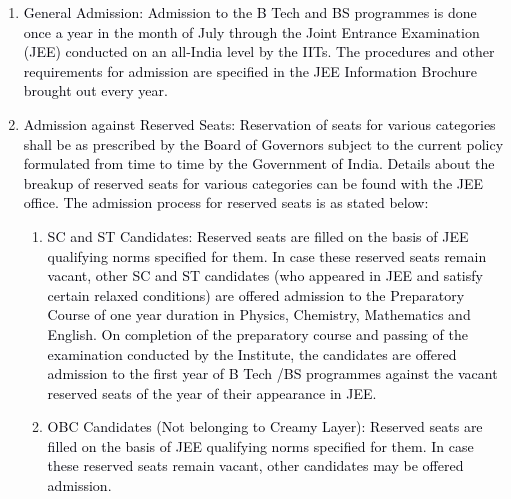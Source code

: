\documentclass[12pt]{article}
\begin{document}
\vspace{\baselineskip}
\begin{enumerate}
	\item {\fontsize{10pt}{12.0pt}\selectfont \textcolor[HTML]{00000A}{General Admission: Admission to the B Tech and BS programmes is done once a year in the month of July through the Joint Entrance Examination (JEE) conducted on an all-India level by the IITs. The procedures and other requirements for admission are specified in the JEE Information Brochure brought out every year.}\par}\par


\vspace{\baselineskip}
	\item {\fontsize{10pt}{12.0pt}\selectfont \textcolor[HTML]{00000A}{Admission against Reserved Seats: Reservation of seats for various categories shall be as prescribed by the Board of Governors subject to the current policy formulated from time to time by the Government of India. Details about the breakup of reserved seats for various categories can be found with the JEE office. The admission process for reserved seats is as stated below:}\par}\par


\vspace{\baselineskip}
\begin{enumerate}
	\item {\fontsize{10pt}{12.0pt}\selectfont \textcolor[HTML]{00000A}{SC and ST Candidates: Reserved seats are filled on the basis of JEE qualifying norms specified for them. In case these reserved seats remain vacant, other SC and ST candidates (who appeared in JEE and satisfy certain relaxed conditions) are offered admission to the Preparatory Course of one year duration in Physics, Chemistry, Mathematics and English. On completion of the preparatory course and passing of the examination conducted by the Institute, the candidates are offered admission to the first year of B Tech /BS programmes against the vacant reserved seats of the year of their appearance in JEE.}\par}\par


\vspace{\baselineskip}
	\item {\fontsize{9pt}{10.8pt}\selectfont \textcolor[HTML]{00000A}{OBC Candidates (Not belonging to Creamy Layer): Reserved seats are filled on the basis of JEE qualifying norms specified for them. In case these reserved seats remain vacant, other candidates may be offered admission.}\par}\par



\end{enumerate}
\end{enumerate}
\end{document}

